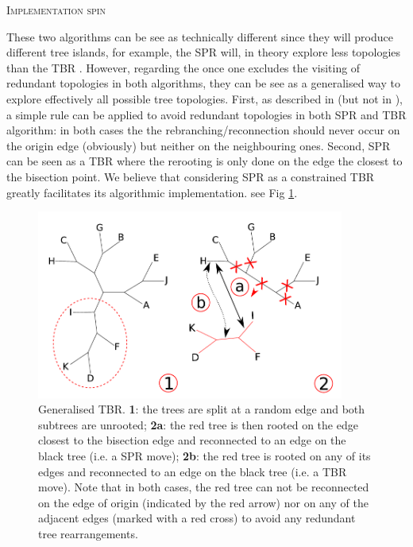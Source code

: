 \documentclass[12pt,letterpaper]{article}
\renewcommand{\section}[1]{%
\bigskip
\begin{center}
\begin{Large}
\normalfont\scshape #1
\medskip
\end{Large}
\end{center}}
\begin{document}
\section{Implementation spin}
These two algorithms can be see as technically different since they will produce different tree islands, for example, the SPR will, in theory explore less topologies than the TBR \citep[see above and][]{morrison2007increasing,lakner2008efficiency}.
However, regarding the once one excludes the visiting of redundant topologies in both algorithms, they can be see as a generalised way to explore effectively all possible tree topologies.
First, as described in \cite{allen2001subtree} (but not in \citealt{felsenstein2004inferring}), a simple rule can be applied to avoid redundant topologies in both SPR and TBR algorithm: in both cases the the rebranching/reconnection should never occur on the origin edge (obviously) but neither on the neighbouring ones.
Second, SPR can be seen as a TBR where the rerooting is only done on the edge the closest to the bisection point.
We believe that considering SPR as a constrained TBR greatly facilitates its algorithmic implementation.
see Fig \ref{Figure_TBR_modif}.

\begin{figure}[!htbp]
\centering
   \includegraphics[width=0.9\textwidth]{Figure/TBR_modif.pdf}
\caption{Generalised TBR. \textbf{1}: the trees are split at a random edge and both subtrees are unrooted; \textbf{2a}: the red tree is then rooted on the edge closest to the bisection edge and reconnected to an edge on the black tree (i.e. a SPR move); \textbf{2b}: the red tree is rooted on any of its edges and reconnected to an edge on the black tree (i.e. a TBR move). Note that in both cases, the red tree can not be reconnected on the edge of origin (indicated by the red arrow) nor on any of the adjacent edges (marked with a red cross) to avoid any redundant tree rearrangements.}
\label{Figure_TBR_modif}
\end{figure}
\end{document}
